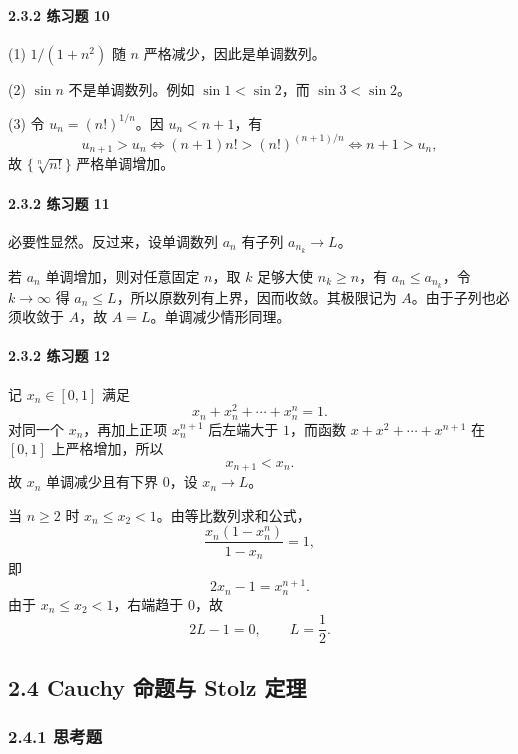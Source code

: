 \paragraph{2.3.2 练习题 10}
\begin{xsolution}
(1) $1/(1+n^2)$ 随 $n$ 严格减少，因此是单调数列。

(2) $\sin n$ 不是单调数列。例如 $\sin1<\sin2$，而 $\sin3<\sin2$。

(3) 令 $u_n=(n!)^{1/n}$。因 $u_n<n+1$，有
\[
  u_{n+1}>u_n
  \Longleftrightarrow
  (n+1)n!>(n!)^{(n+1)/n}
  \Longleftrightarrow n+1>u_n,
\]
故 $\{\sqrt[n]{n!}\}$ 严格单调增加。
\end{xsolution}

\paragraph{2.3.2 练习题 11}
\begin{xsolution}
必要性显然。反过来，设单调数列 $a_n$ 有子列 $a_{n_k}\to L$。

若 $a_n$ 单调增加，则对任意固定 $n$，取 $k$ 足够大使 $n_k\ge n$，有 $a_n\le a_{n_k}$，令 $k\to\infty$ 得 $a_n\le L$，所以原数列有上界，因而收敛。其极限记为 $A$。由于子列也必须收敛于 $A$，故 $A=L$。单调减少情形同理。
\end{xsolution}

\paragraph{2.3.2 练习题 12}
\begin{xsolution}
记 $x_n\in[0,1]$ 满足
\[
  x_n+x_n^2+\cdots+x_n^n=1.
\]
对同一个 $x_n$，再加上正项 $x_n^{n+1}$ 后左端大于 $1$，而函数 $x+x^2+\cdots+x^{n+1}$ 在 $[0,1]$ 上严格增加，所以
\[
  x_{n+1}<x_n.
\]
故 $x_n$ 单调减少且有下界 $0$，设 $x_n\to L$。

当 $n\ge2$ 时 $x_n\le x_2<1$。由等比数列求和公式，
\[
  \frac{x_n(1-x_n^n)}{1-x_n}=1,
\]
即
\[
  2x_n-1=x_n^{n+1}.
\]
由于 $x_n\le x_2<1$，右端趋于 $0$，故
\[
  2L-1=0,
  \qquad
  \boxed{L=\frac12}.
\]
\end{xsolution}

\subsection*{2.4 Cauchy 命题与 Stolz 定理}

\subsubsection*{2.4.1 思考题}

